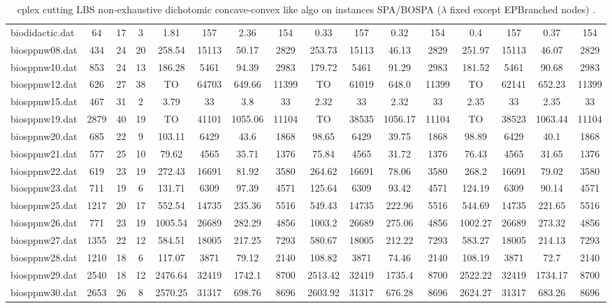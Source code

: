 \begin{sidewaystable}[!ht]
{\begin{tabular}{lccccccccccccccc}
biodidactic.dat & 64 & 17 & 3 & 1.81 & 157 & 2.36 & 154 & 0.33 & 157 &  \textcolor{blue2}{0.32} & 154 & 0.4 & 157 & 0.37 & 154 \\
biosppnw08.dat & 434 & 24 & 20 & 258.54 & 15113 & 50.17 & 2829 & 253.73 & 15113 & 46.13 & 2829 & 251.97 & 15113 & 46.07 & 2829 \\
biosppnw10.dat & 853 & 24 & 13 & 186.28 & 5461 & 94.39 & 2983 & 179.72 & 5461 & 91.29 & 2983 & 181.52 & 5461 & 90.68 & 2983 \\
biosppnw12.dat & 626 & 27 & 38 &  TO & 64703 & 649.66 & 11399 &  TO & 61019 & 648.0 & 11399 &  TO & 62141 & 652.23 & 11399 \\
biosppnw15.dat & 467 & 31 & 2 & 3.79 & 33 & 3.8 & 33 &  \textcolor{blue2}{2.32} & 33 &  \textcolor{blue2}{2.32} & 33 & 2.35 & 33 & 2.35 & 33 \\
biosppnw19.dat & 2879 & 40 & 19 &  TO & 41101 &  \textcolor{blue2}{1055.06} & 11104 &  TO & 38535 & 1056.17 & 11104 &  TO & 38523 & 1063.44 & 11104 \\
biosppnw20.dat & 685 & 22 & 9 & 103.11 & 6429 & 43.6 & 1868 & 98.65 & 6429 &  \textcolor{blue2}{39.75} & 1868 & 98.89 & 6429 & 40.1 & 1868 \\
biosppnw21.dat & 577 & 25 & 10 & 79.62 & 4565 & 35.71 & 1376 & 75.84 & 4565 & 31.72 & 1376 & 76.43 & 4565 & 31.65 & 1376 \\
biosppnw22.dat & 619 & 23 & 19 & 272.43 & 16691 & 81.92 & 3580 & 264.62 & 16691 &  \textcolor{blue2}{78.06} & 3580 & 268.2 & 16691 & 79.02 & 3580 \\
biosppnw23.dat & 711 & 19 & 6 & 131.71 & 6309 & 97.39 & 4571 & 125.64 & 6309 & 93.42 & 4571 & 124.19 & 6309 & 90.14 & 4571 \\
biosppnw25.dat & 1217 & 20 & 17 & 552.54 & 14735 & 235.36 & 5516 & 549.43 & 14735 & 222.96 & 5516 & 544.69 & 14735 & 221.65 & 5516 \\
biosppnw26.dat & 771 & 23 & 19 & 1005.54 & 26689 & 282.29 & 4856 & 1003.2 & 26689 & 275.06 & 4856 & 1002.27 & 26689 & 273.32 & 4856 \\
biosppnw27.dat & 1355 & 22 & 12 & 584.51 & 18005 & 217.25 & 7293 & 580.67 & 18005 & 212.22 & 7293 & 583.27 & 18005 & 214.13 & 7293 \\
biosppnw28.dat & 1210 & 18 & 6 & 117.07 & 3871 & 79.12 & 2140 & 108.82 & 3871 & 74.46 & 2140 & 108.19 & 3871 & 72.7 & 2140 \\
biosppnw29.dat & 2540 & 18 & 12 & 2476.64 & 32419 & 1742.1 & 8700 & 2513.42 & 32419 & 1735.4 & 8700 & 2522.22 & 32419 & 1734.17 & 8700 \\
biosppnw30.dat & 2653 & 26 & 8 & 2570.25 & 31317 & 698.76 & 8696 & 2603.92 & 31317 &  \textcolor{blue2}{676.28} & 8696 & 2624.27 & 31317 & 683.26 & 8696 \\
\bottomrule
\end{tabular}
}%
\caption{cplex cutting LBS non-exhaustive dichotomic concave-convex like algo on instances SPA/BOSPA ($\lambda$ fixed except EPBranched nodes) .}
\end{sidewaystable}
